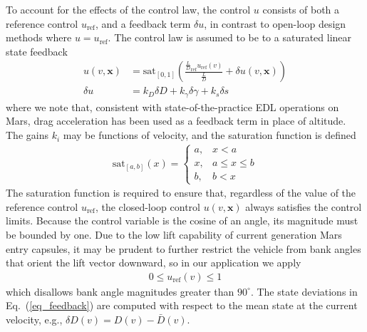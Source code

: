 \documentclass[journal ]{new-aiaa}
\newcommand{\state}{\ensuremath{\mathbf{x}}}
\newcommand{\ur}{\ensuremath{u_{\mathrm{ref}}}}
\begin{document}
To account for the effects of the control law, the control $u$ consists of both a reference control $\ur$, and a feedback term $\delta u$, in contrast to open-loop design methods where $u=\ur$. 
The control law is assumed to be to a saturated linear state feedback 
\begin{align}
u(v,\state) &= \mathrm{sat}_{[0,1]}\left(\frac{\frac{L}{D}_{\mathrm{ref}}\ur(v)}{\frac{L}{D}} + \delta u(v,\state)\right)\\
\delta u &= k_D\delta D + k_{\gamma}\delta\gamma + k_s\delta s \label{eq_feedback}
\end{align}
where we note that, consistent with state-of-the-practice EDL operations on Mars, drag acceleration has been used as a feedback term in place of altitude. The gains $k_i$ may be functions of velocity, and the saturation function is defined
\begin{align*}
\mathrm{sat}_{[a,b]}(x) = \left\{\begin{array}{lc}
        a, &  x < a\\
        x, &  a\le x \le b\\
        b, &  b < x
        \end{array} \right. %
\end{align*}
The saturation function is required to ensure that, regardless of the value of the reference control \ur, the closed-loop control $u(v,\state)$ always satisfies the control limits. Because the control variable is the cosine of an angle, its magnitude must be bounded by one. Due to the low lift capability of current generation Mars entry capsules, it may be prudent to further restrict the vehicle from bank angles that orient the lift vector downward, so in our application we apply
\begin{align}
	0 \le \ur(v) \le 1 \label{eq_control_bounds}
\end{align}
which disallows bank angle magnitudes greater than $90^\circ$.
The state deviations in Eq.~(\ref{eq_feedback}) are computed with respect to the mean state at the current velocity, e.g., $\delta D(v) = D(v) - \bar{D}(v)$.
\end{document}
